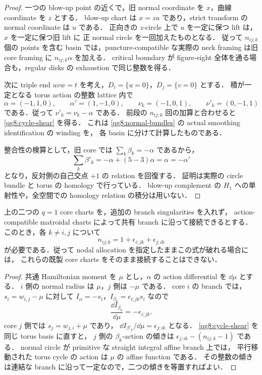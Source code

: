 \begin{proof}
一つの blow-up point の近くで，旧 normal coordinate を $x$，曲線 coordinate を $z$ とする．
blow-up chart は $x=zu$ であり，strict transform の normal coordinate は $u$ である．
正向きの $z$-circle 上で $u$ を一定に保つ lift は，$x$ を一定に保つ旧 lift に
正 normal circle を一回加えたものとなる．
従って $n_{ij;k}$ 個の points を含む basin では，puncture-compatible な実際の
neck framing は旧 core framing に $n_{ij;k}\alpha$ を加える．
critical boundary が figure-eight 全体を通る場合も，regular disks の exhaustion で同じ整数を得る．

次に triple end $uvw=t$ を考え，$D_i=\{u=0\}$，$D_j=\{v=0\}$ とする．
積が一定となる torus action の整数 lattice 内で
\[
 \alpha=(-1,1,0),\qquad \alpha'=(1,-1,0),\qquad
 \nu_k=(-1,0,1),\qquad \nu'_k=(0,-1,1)
\]
である．従って $\nu'_k=\nu_k-\alpha$ である．
前段の $n_{ij;k}$ 回の加算と合わせると \eqref{qg8:cycle-shear} を得る．
これは \eqref{qg8:normal-bundles} の actual smoothing identification の winding を，
各 basin に分けて計算したものである．

整合性の検算として，旧 core では $\sum_k\beta_k=-\alpha$ であるから，
\[
 \sum_k\beta'_k=-\alpha+(5-3)\alpha=\alpha=-\alpha'
\]
となり，反対側の自己交点 $+1$ の relation を回復する．
証明は実際の circle bundle と torus の homology で行っている．
blow-up complement の $H_1$ への単射性や，全空間での homology relation の積分は用いない．
\end{proof}

\begin{proposition}\label{qg8:slope}
上の二つの $q=1$ core charts を，追加の branch singularities を入れず，
action-compatible matroidal charts によって共有 branch に沿って接続できるとする．
このとき，各 $k\ne i,j$ について
\begin{equation}\label{qg8:node-count}
 n_{ij;k}=1+\epsilon_{i;jk}+\epsilon_{j;ik}
\end{equation}
が必要である．従って nodal allocation を指定したままこの式が破れる場合には，
これらの既製 core charts をそのまま接続することはできない．
\end{proposition}

\begin{proof}
共通 Hamiltonian moment を $\mu$ とし，$\alpha$ の action differential を $\dd\mu$ とする．
$i$ 側の normal radius は $\mu$，$j$ 側は $-\mu$ である．
core $i$ の branch では，$s_i=w_{i,j}-\mu$ に対して
$I_\alpha=-s_i$，$I_{\beta_k}=\epsilon_{i;jk}s_i$ なので
\[
 \frac{\dd I_{\beta_k}}{\dd\mu}=-\epsilon_{i;jk}.
\]
core $j$ 側では $s_j=w_{j,i}+\mu$ であり，
$\dd I_{\beta'_k}/\dd\mu=\epsilon_{j;ik}$ となる．
\eqref{qg8:cycle-shear} を同じ torus basis に直すと，
$j$ 側の $\beta_k$-action の傾きは $\epsilon_{j;ik}-(n_{ij;k}-1)$ である．
normal circle が primitive な straight integral affine branch 上では，
平行移動された torus cycle の action は $\mu$ の affine function である．
その整数の傾きは連結な branch に沿って一定なので，二つの傾きを等置すればよい．
\end{proof}

